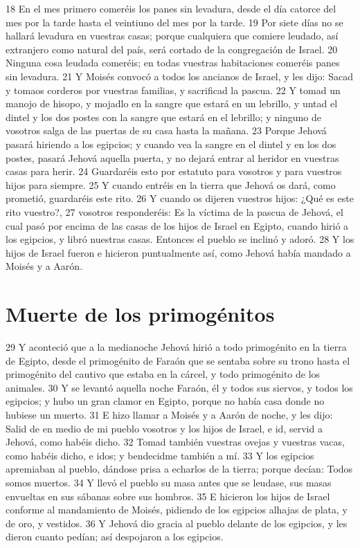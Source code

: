 18 En el mes primero comeréis los panes sin levadura, desde el día catorce del mes por la tarde hasta el veintiuno del mes por la tarde.
19 Por siete días no se hallará levadura en vuestras casas; porque cualquiera que comiere leudado, así extranjero como natural del país, será cortado de la congregación de Israel.
20 Ninguna cosa leudada comeréis; en todas vuestras habitaciones comeréis panes sin levadura.
21 Y Moisés convocó a todos los ancianos de Israel, y les dijo: Sacad y tomaos corderos por vuestras familias, y sacrificad la pascua.
22 Y tomad un manojo de hisopo, y mojadlo en la sangre que estará en un lebrillo, y untad el dintel y los dos postes con la sangre que estará en el lebrillo; y ninguno de vosotros salga de las puertas de su casa hasta la mañana.
23 Porque Jehová pasará hiriendo a los egipcios; y cuando vea la sangre en el dintel y en los dos postes, pasará Jehová aquella puerta, y no dejará entrar al heridor en vuestras casas para herir.
24 Guardaréis esto por estatuto para vosotros y para vuestros hijos para siempre.
25 Y cuando entréis en la tierra que Jehová os dará, como prometió, guardaréis este rito.
26 Y cuando os dijeren vuestros hijos: ¿Qué es este rito vuestro?,
27 vosotros responderéis: Es la víctima de la pascua de Jehová, el cual pasó por encima de las casas de los hijos de Israel en Egipto, cuando hirió a los egipcios, y libró nuestras casas. Entonces el pueblo se inclinó y adoró.
28 Y los hijos de Israel fueron e hicieron puntualmente así, como Jehová había mandado a Moisés y a Aarón.

\section{Muerte de los primogénitos}
29 Y aconteció que a la medianoche Jehová hirió a todo primogénito en la tierra de Egipto, desde el primogénito de Faraón que se sentaba sobre su trono hasta el primogénito del cautivo que estaba en la cárcel, y todo primogénito de los animales.
30 Y se levantó aquella noche Faraón, él y todos sus siervos, y todos los egipcios; y hubo un gran clamor en Egipto, porque no había casa donde no hubiese un muerto.
31 E hizo llamar a Moisés y a Aarón de noche, y les dijo: Salid de en medio de mi pueblo vosotros y los hijos de Israel, e id, servid a Jehová, como habéis dicho.
32 Tomad también vuestras ovejas y vuestras vacas, como habéis dicho, e idos; y bendecidme también a mí.
33 Y los egipcios apremiaban al pueblo, dándose prisa a echarlos de la tierra; porque decían: Todos somos muertos.
34 Y llevó el pueblo su masa antes que se leudase, sus masas envueltas en sus sábanas sobre sus hombros.
35 E hicieron los hijos de Israel conforme al mandamiento de Moisés, pidiendo de los egipcios alhajas de plata, y de oro, y vestidos.
36 Y Jehová dio gracia al pueblo delante de los egipcios, y les dieron cuanto pedían; así despojaron a los egipcios.

